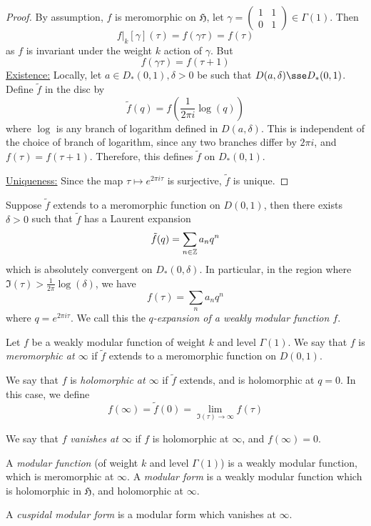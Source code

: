 \documentclass{article}
\newcommand{\mfH}{\mathfrak{H}}
\begin{document}
\begin{proof}
    By assumption, \(f\) is meromorphic on \(\mfH\), let \(\gamma = \begin{pmatrix}
        1 & 1 \\ 0 & 1
    \end{pmatrix} \in \Gamma(1)\). Then
    \[f\vert_k[\gamma](\tau) = f(\gamma\tau) = f(\tau)\]
    as \(f\) is invariant under the weight \(k\) action of \(\gamma\). But
    \[f(\gamma\tau) = f(\tau + 1)\]
    \underline{Existence:} Locally, let \(a \in D_*(0, 1), \delta > 0\) be such that \(D(a, \delta) \sse D_*(0, 1)\). Define \(\tilde f\) in the disc by
    \[\tilde f(q) = f\left(\frac{1}{2\pi i}\log(q)\right)\]
    where \(\log\) is any branch of logarithm defined in \(D(a, \delta)\). This is independent of the choice of branch of logarithm, since any two branches differ by \(2\pi i\), and \(f(\tau) = f(\tau + 1)\). Therefore, this defines \(\tilde f\) on \(D_*(0, 1)\).

    \underline{Uniqueness:} Since the map \(\tau \mapsto e^{2\pi i \tau}\) is surjective, \(\tilde f\) is unique. 
\end{proof}

Suppose \(\tilde f\) extends to a meromorphic function on \(D(0, 1)\), then there exists \(\delta > 0\) such that \(\tilde f\) has a Laurent expansion
\[\tilde f(q) = \sum_{n \in \mathbb{Z}}a_nq^n\]
which is absolutely convergent on \(D_*(0, \delta)\). In particular, in the region where \(\Im(\tau) > \frac{1}{2\pi}\log(\delta)\), we have
\[f(\tau) = \sum_n a_n q^n\]
where \(q = e^{2\pi i \tau}\). We call this the \emph{\(q\)-expansion of a weakly modular function \(f\)}.

\begin{definition}
    Let \(f\) be a weakly modular function of weight \(k\) and level \(\Gamma(1)\). We say that \(f\) is \emph{meromorphic at \(\infty\)} if \(\tilde f\) extends to a meromorphic function on \(D(0, 1)\).

    We say that \(f\) is \emph{holomorphic at \(\infty\)} if \(\tilde f\) extends, and is holomorphic at \(q = 0\). In this case, we define
    \[f(\infty) = \tilde f(0) = \lim_{\Im(\tau) \to \infty}f(\tau)\]

    We say that \(f\) \emph{vanishes at \(\infty\)} if \(f\) is holomorphic at \(\infty\), and \(f(\infty) = 0\).
\end{definition}

\begin{definition}
     A \emph{modular function} (of weight \(k\) and level \(\Gamma(1)\)) is a weakly modular function, which is meromorphic at \(\infty\). A \emph{modular form} is a weakly modular function which is holomorphic in \(\mfH\), and holomorphic at \(\infty\).

    A \emph{cuspidal modular form} is a modular form which vanishes at \(\infty\).
\end{definition}
\end{document}
